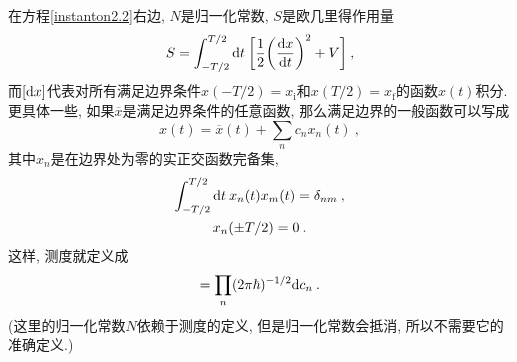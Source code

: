 在方程\eqref{instanton2.2}右边, $N$是归一化常数, $S$是欧几里得作用量
\begin{equation}
    S=\int_{-T/2}^{T/2} \mathrm{d} t\:\biggl[\frac{1}{2}\biggl(\frac{\mathrm{d} x}{\mathrm{d} t}\biggr)^{2}+V\biggr] \:, \label{instanton2.5}
\end{equation}
而$[\mathrm{d} x]$代表对所有满足边界条件$x(-T/2)=x_{\text{i}}$和$x(T/2)=x_{\text{f}}$的函数$x(t)$积分. 更具体一些, 如果$\overline{x}$是满足边界条件的任意函数, 那么满足边界的一般函数可以写成
\begin{equation}
    x(t)=\overline{x}(t)+\sum_{n}c_{n}x_{n}(t) \:, \label{instanton2.6}
\end{equation}
其中$x_{n}$是在边界处为零的实正交函数完备集,
\begin{subequations}\label{instanton2.7}
    \begin{gather}
        \int_{-T/2}^{T/2} \mathrm{d} t\: x_{n}(t)x_{m}(t) = \delta_{nm} \:, \label{instanton2.7a} \\
        x_{n}(\pm T/2)=0 \:.  \label{instanton2.7b}
    \end{gather}
\end{subequations}
这样, 测度就定义成
\begin{equation}
    [\dif x] = \prod_{n} (2\pi\hbar)^{-1/2} \dif c_{n} \:. \label{instanton2.8}
\end{equation}
(这里的归一化常数$N$依赖于测度的定义, 但是归一化常数会抵消, 所以不需要它的准确定义.)


